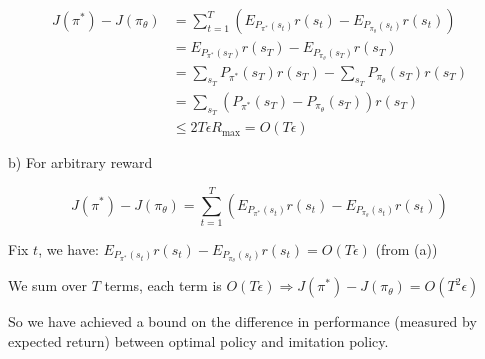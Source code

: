 \begin{solution}
\begin{enumerate}
              \begin{align*}
                  J(\pi^*) - J(\pi_\theta) & = \sum_{t=1}^{T} \left( E_{P_{\pi^*}(s_t)} r(s_t) - E_{P_{\pi_\theta}(s_t)} r(s_t) \right) \\
                                           & = E_{P_{\pi^*}(s_T)} r(s_T) - E_{P_{\pi_\theta}(s_T)} r(s_T)                               \\
                                           & = \sum_{s_T} P_{\pi^*}(s_T) r(s_T) - \sum_{s_T} P_{\pi_\theta}(s_T) r(s_T)                 \\
                                           & = \sum_{s_T} (P_{\pi^*}(s_T) - P_{\pi_\theta}(s_T)) r(s_T)                                 \\
                                           & \le 2T\epsilon R_{\max} = O(T\epsilon)
              \end{align*}

              b) For arbitrary reward

              $$J(\pi^*) - J(\pi_\theta) = \sum_{t=1}^{T} \left( E_{P_{\pi^*}(s_t)} r(s_t) - E_{P_{\pi_\theta}(s_t)} r(s_t) \right)$$

              Fix $t$, we have: $E_{P_{\pi^*}(s_t)} r(s_t) - E_{P_{\pi_\theta}(s_t)} r(s_t) = O(T\epsilon)$ (from (a))

              We sum over $T$ terms, each term is $O(T\epsilon) \Rightarrow J(\pi^*) - J(\pi_\theta) = O(T^2\epsilon)$

              So we have achieved a bound on the difference in performance
              (measured by expected return) between optimal policy and imitation policy.
    \end{enumerate}
\end{solution}